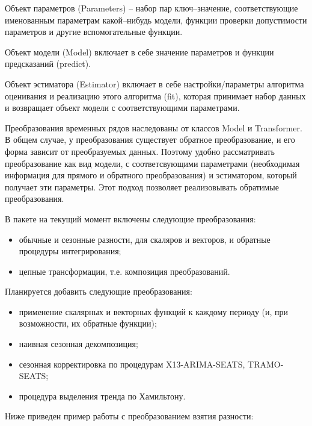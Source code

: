 \documentclass[a4paper,14pt]{extreport}
\begin{document}
	Объект параметров (Parameters) -- набор пар ключ--значение, соответствующие именованным параметрам какой--нибудь модели, функции проверки допустимости параметров и другие вспомогательные функции.
	
	Объект модели (Model) включает в себе значение параметров и функции предсказаний (predict).
	
	Объект эстиматора (Estimator) включает в себе настройки/параметры алгоритма оценивания и реализацию этого алгоритма (fit), которая принимает набор данных и возвращает объект модели с соответствующими параметрами.
	
	
	Преобразования временных рядов наследованы от классов Model и Transformer. В общем случае, у преобразования существует обратное преобразование, и его форма зависит от преобразуемых данных. Поэтому удобно рассматривать преобразование как вид модели, с соответсвующими параметрами (необходимая информация для прямого и обратного преобразования) и эстиматором, который получает эти параметры. Этот подход позволяет реализовывать обратимые преобразования.
	
	В пакете на текущий момент включены следующие преобразования:
	\begin{itemize}
		\item обычные и сезонные разности, для скаляров и векторов, и обратные процедуры интегрирования;
		\item цепные трансформации, т.е. композиция преобразований.
	\end{itemize}
	
	Планируется добавить следующие преобразования:
	\begin{itemize}
		\item применение скалярных и векторных функций к каждому периоду (и, при возможности, их обратные функции);
		\item наивная сезонная декомпозиция;
		\item сезонная корректировка по процедурам X13-ARIMA-SEATS, TRAMO-SEATS;
		\item процедура выделения тренда по Хамильтону.
	\end{itemize}
	
	Ниже приведен пример работы с преобразованием взятия разности:
	
\end{document}
